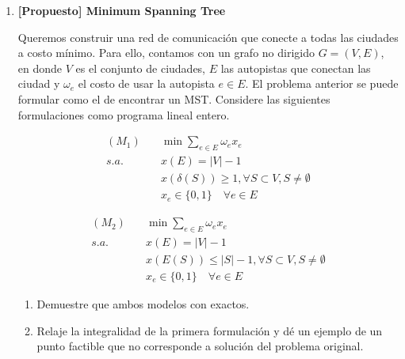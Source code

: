 \begin{enumerate}[label ={\bf P\arabic*}]
	\item \textbf{[Propuesto] Minimum Spanning Tree}

	Queremos construir una red de comunicación que conecte a todas las ciudades a costo mínimo. Para ello, contamos con un grafo no dirigido $G=(V,E)$, en donde $V$ es el conjunto de ciudades, $E$ las autopistas que conectan las ciudad y $\omega_e$ el costo de usar la autopista $e\in E$. El problema anterior se puede formular como el de encontrar un MST.
	Considere las siguientes formulaciones como programa lineal entero.
    
    \begin{align*}
        (M_1) \quad & \min \sum_{e\in E}\omega_ex_e\\
        s.a.\quad & x(E)=|V|-1\\
        & x(\delta(S))\geq 1,\forall S\subset V, S\neq \emptyset\\
        &x_e\in\{0,1\}\quad\forall e\in E
    \end{align*}
    
    \begin{align*}
        (M_2) \quad & \min \sum_{e\in E}\omega_ex_e\\
        s.a.\quad & x(E)=|V|-1\\
        & x(E(S))\leq |S|-1,\forall S\subset V, S\neq \emptyset\\
        &x_e\in\{0,1\}\quad\forall e\in E
    \end{align*}

	\begin{enumerate}
		\item Demuestre que ambos modelos con exactos.
		\item Relaje la integralidad de la primera formulación y dé un ejemplo de un punto factible que no corresponde a solución del problema original.
	\end{enumerate}
\end{enumerate}
